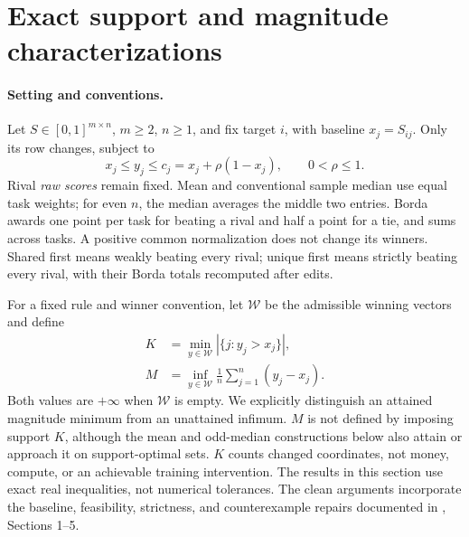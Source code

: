 \appendix
\newtheorem{appthm}{Theorem}[section]
\newtheorem{appprop}[appthm]{Proposition}
\newtheorem{applemma}[appthm]{Lemma}

\section{Exact support and magnitude characterizations}
\label{app:theory}\label{app:proofs}

\paragraph{Setting and conventions.}
Let $S\in[0,1]^{m\times n}$, $m\geq2$, $n\geq1$, and fix target $i$, with baseline $x_j=S_{ij}$. Only its row changes, subject to
\begin{equation}
 x_j\leq y_j\leq c_j=x_j+\rho(1-x_j),\qquad 0<\rho\leq1.
 \label{app:box}
\end{equation}
Rival \emph{raw scores} remain fixed. Mean and conventional sample median use equal task weights; for even $n$, the median averages the middle two entries. Borda awards one point per task for beating a rival and half a point for a tie, and sums across tasks. A positive common normalization does not change its winners. Shared first means weakly beating every rival; unique first means strictly beating every rival, with their Borda totals recomputed after edits.

For a fixed rule and winner convention, let $\mathcal W$ be the admissible winning vectors and define
\begin{align}
 K&=\min_{y\in\mathcal W}|\{j:y_j>x_j\}|,\label{app:K}\\
 M&=\inf_{y\in\mathcal W}\frac1n\sum_{j=1}^n(y_j-x_j).
 \label{app:M}
\end{align}
Both values are $+\infty$ when $\mathcal W$ is empty. We explicitly distinguish an attained magnitude minimum from an unattained infimum. $M$ is not defined by imposing support $K$, although the mean and odd-median constructions below also attain or approach it on support-optimal sets. $K$ counts changed coordinates, not money, compute, or an achievable training intervention. The results in this section use exact real inequalities, not numerical tolerances. The clean arguments incorporate the baseline, feasibility, strictness, and counterexample repairs documented in , Sections 1--5.

